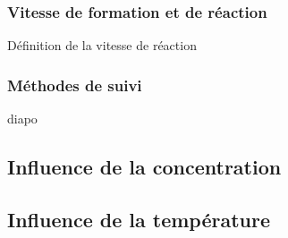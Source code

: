 \subsubsection{Vitesse de formation et de réaction}

Définition de la vitesse de réaction

\subsubsection{Méthodes de suivi}

diapo

\subsection{Influence de la concentration}

\subsection{Influence de la température}